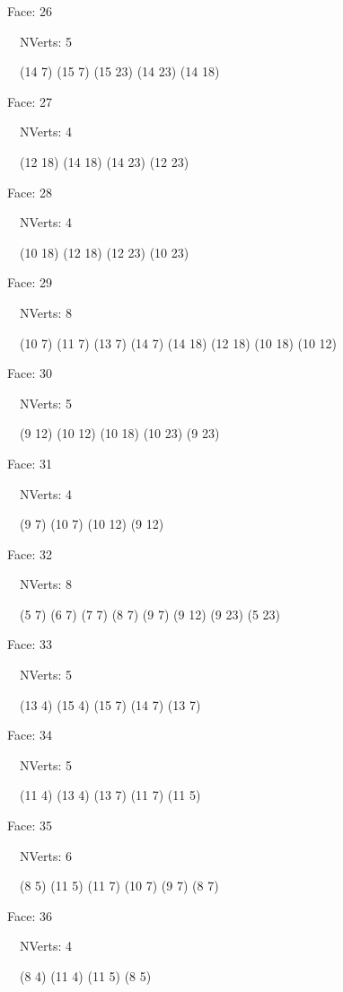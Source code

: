 \documentclass{article}
\begin{document}
{\footnotesize 

Face: 26

\   \    NVerts: 5

 \   \   (14 7) (15 7) (15 23) (14 23) (14 18)}

{\footnotesize 

Face: 27

\   \    NVerts: 4

 \   \   (12 18) (14 18) (14 23) (12 23)}

{\footnotesize 

Face: 28

\   \    NVerts: 4

 \   \   (10 18) (12 18) (12 23) (10 23)}

{\footnotesize 

Face: 29

\   \    NVerts: 8

 \   \   (10 7) (11 7) (13 7) (14 7) (14 18) (12 18) (10 18) (10 12)}

{\footnotesize 

Face: 30

\   \    NVerts: 5

 \   \   (9 12) (10 12) (10 18) (10 23) (9 23)}

{\footnotesize 

Face: 31

\   \    NVerts: 4

 \   \   (9 7) (10 7) (10 12) (9 12)}

{\footnotesize 

Face: 32

\   \    NVerts: 8

 \   \   (5 7) (6 7) (7 7) (8 7) (9 7) (9 12) (9 23) (5 23)}

{\footnotesize 

Face: 33

\   \    NVerts: 5

 \   \   (13 4) (15 4) (15 7) (14 7) (13 7)}

{\footnotesize 

Face: 34

\   \    NVerts: 5

 \   \   (11 4) (13 4) (13 7) (11 7) (11 5)}

{\footnotesize 

Face: 35

\   \    NVerts: 6

 \   \   (8 5) (11 5) (11 7) (10 7) (9 7) (8 7)}

{\footnotesize 

Face: 36

\   \    NVerts: 4

 \   \   (8 4) (11 4) (11 5) (8 5)}
\end{document}
